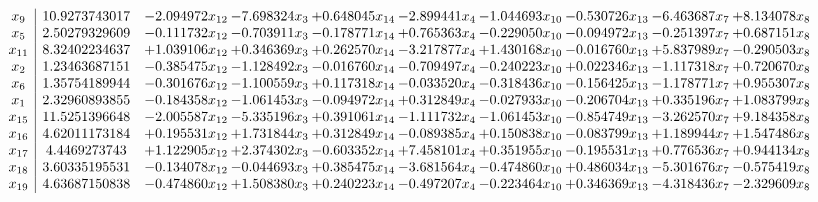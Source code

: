 \documentclass[10pt]{article}
\begin{document}
 \[\begin{array}{c| c c@{\hskip 2pt} c@{\hskip 2pt} c@{\hskip 2pt} c@{\hskip 2pt} c@{\hskip 2pt} c@{\hskip 2pt} c@{\hskip 2pt} c@{\hskip 2pt} }
 x_{9}   &  10.9273743017 & -2.094972 x_{12} & -7.698324 x_{3} & + 0.648045 x_{14} & -2.899441 x_{4} & -1.044693 x_{10} & -0.530726 x_{13} & -6.463687 x_{7} & + 8.134078 x_{8}\\
 x_{5}   &  2.50279329609 & -0.111732 x_{12} & -0.703911 x_{3} & -0.178771 x_{14} & + 0.765363 x_{4} & -0.229050 x_{10} & -0.094972 x_{13} & -0.251397 x_{7} & + 0.687151 x_{8}\\
 x_{11}   &  8.32402234637 & + 1.039106 x_{12} & + 0.346369 x_{3} & + 0.262570 x_{14} & -3.217877 x_{4} & + 1.430168 x_{10} & -0.016760 x_{13} & + 5.837989 x_{7} & -0.290503 x_{8}\\
 x_{2}   &  1.23463687151 & -0.385475 x_{12} & -1.128492 x_{3} & -0.016760 x_{14} & -0.709497 x_{4} & -0.240223 x_{10} & + 0.022346 x_{13} & -1.117318 x_{7} & + 0.720670 x_{8}\\
 x_{6}   &  1.35754189944 & -0.301676 x_{12} & -1.100559 x_{3} & + 0.117318 x_{14} & -0.033520 x_{4} & -0.318436 x_{10} & -0.156425 x_{13} & -1.178771 x_{7} & + 0.955307 x_{8}\\
 x_{1}   &  2.32960893855 & -0.184358 x_{12} & -1.061453 x_{3} & -0.094972 x_{14} & + 0.312849 x_{4} & -0.027933 x_{10} & -0.206704 x_{13} & + 0.335196 x_{7} & + 1.083799 x_{8}\\
 x_{15}   &  11.5251396648 & -2.005587 x_{12} & -5.335196 x_{3} & + 0.391061 x_{14} & -1.111732 x_{4} & -1.061453 x_{10} & -0.854749 x_{13} & -3.262570 x_{7} & + 9.184358 x_{8}\\
 x_{16}   &  4.62011173184 & + 0.195531 x_{12} & + 1.731844 x_{3} & + 0.312849 x_{14} & -0.089385 x_{4} & + 0.150838 x_{10} & -0.083799 x_{13} & + 1.189944 x_{7} & + 1.547486 x_{8}\\
 x_{17}   &  4.4469273743 & + 1.122905 x_{12} & + 2.374302 x_{3} & -0.603352 x_{14} & + 7.458101 x_{4} & + 0.351955 x_{10} & -0.195531 x_{13} & + 0.776536 x_{7} & + 0.944134 x_{8}\\
 x_{18}   &  3.60335195531 & -0.134078 x_{12} & -0.044693 x_{3} & + 0.385475 x_{14} & -3.681564 x_{4} & -0.474860 x_{10} & + 0.486034 x_{13} & -5.301676 x_{7} & -0.575419 x_{8}\\
 x_{19}   &  4.63687150838 & -0.474860 x_{12} & + 1.508380 x_{3} & + 0.240223 x_{14} & -0.497207 x_{4} & -0.223464 x_{10} & + 0.346369 x_{13} & -4.318436 x_{7} & -2.329609 x_{8}\\

\end{array}\]
\end{document}
